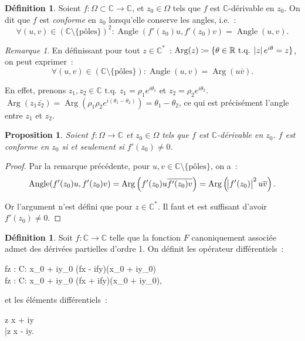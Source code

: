 \documentclass{report}
\newtheorem{prp}[thm]{Proposition}
\theoremstyle{definition}
\newtheorem{déf}[thm]{Définition}
\theoremstyle{remark}
\newtheorem*{rmq}{Remarque}
\numberwithin{equation}{section}
\newcommand{\C}{\mathbb C}
\newcommand{\R}{\mathbb R}
\newcommand{\tq}{\text{ t.q. }}
\DeclareMathOperator{\Angle}{Angle}
\DeclareMathOperator{\Arg}{Arg}
\newcommand{\poles}{{\{\text{pôles}\}}}
\begin{document}
			\begin{déf} Soient $f : \Omega \subset \C \to \C$, et $z_0 \in \Omega$ tels que $f$ est $\C$-dérivable en $z_0$. On dit que $f$ est \textit{conforme} en $z_0$
			lorsqu'elle conserve les angles, i.e.~:
			\begin{equation}
				\forall (u, v) \in \left(\C \setminus \poles\right)^2 : \Angle(f'(z_0)u, f'(z_0)v) = \Angle(u, v).
			\end{equation}
			\end{déf}

			\begin{rmq} En définissant pour tout $z \in \C^*$~: $\Arg(z) \coloneqq \{\theta \in \R \tq \abs ze^{i\theta} = z\}$, on peut exprimer~:
			\begin{equation}
				\forall (u, v) \in \left(\C \setminus \poles\right) : \Angle(u, v) = \Arg(u\bar v).
			\end{equation}

			En effet, prenons $z_1, z_2 \in \C \tq z_1 = \rho_1e^{i\theta_1}$ et $z_2 = \rho_2e^{i\theta_2}$. $\Arg(z_1\bar {z_2}) = \Arg(\rho_1\rho_2e^{i(\theta_1-\theta_2)})
			= \theta_1-\theta_2$, ce qui est précisément l'angle entre $z_1$ et $z_2$.
			\end{rmq}

			\begin{prp} Soient $f : \Omega \to \C$ et $z_0 \in \Omega$ tels que $f$ est $\C$-dérivable en $z_0$. $f$ est conforme en $z_0$ si et seulement si
			$f'(z_0) \neq 0$.
			\end{prp}

			\begin{proof} Par la remarque précédente, pour $u, v \in \C \setminus \poles$, on a~:
			\begin{equation}
				\Angle(f'(z_0)u, f'(z_0)v) = \Arg\left(f'(z_0)u\overline {f'(z_0)v}\right) = \Arg\left(\abs {f'(z_0)}^2u\overline v\right).
			\end{equation}

			Or l'argument n'est défini que pour $z \in \C^*$. Il faut et est suffisant d'avoir $f'(z_0) \neq 0$.
			\end{proof}

			\begin{déf} Soit $f : \C \to \C$ telle que la fonction $F$  canoniquement associée admet des dérivées partielles d'ordre 1. On définit les opérateur
			différentiels~:
			\begin{numcases}{}
				\pd fz : \Omega \to \C : x_0 + iy_0 \mapsto {}\left(\pd fx - i\pd fy\right)(x_0 + iy_0) \\
				\pd f{\overline z} : \Omega \to \C : x_0 + iy_0 \mapsto {}\left(\pd fx + i\pd fy\right)(x_0 + iy_0),
			\end{numcases}
			et les éléments différentiels~:
			\begin{numcases}{}
				\dif z \coloneqq \dif x + i\dif y \\
				\dif \bar z \coloneqq \dif x - i\dif y.
			\end{numcases}
			\end{déf}
\end{document}
